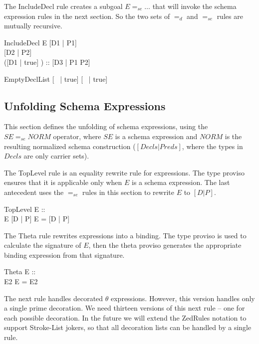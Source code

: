 \documentclass{entcs}
\newcommand{\sexprUnfoldsTo}{\mathrel{=_{se}}}
\newcommand{\declListUnfoldsTo}{\mathrel{=_d}}
\newcommand{\is}{\mathrel{is}}
\begin{document}
The IncludeDecl rule creates a subgoal $E \sexprUnfoldsTo \ldots$ that
will invoke the schema expression rules in the next section.  So the
two sets of $\declListUnfoldsTo$ and $\sexprUnfoldsTo$ rules are
mutually recursive.

\begin{zedrule}{IncludeDecl}
   E \sexprUnfoldsTo [D1 | P1] \\
   [D | true] \declListUnfoldsTo [D2 | P2] \\
   \proviso ([D1 | true] \land [D2 | true]) :: \power [D3 | true] 
\derives
   [E; D | true] \declListUnfoldsTo [D3 |  P1 \land P2]
\end{zedrule}

\begin{zedrule}{EmptyDeclList}
   [~ | true] \declListUnfoldsTo [~ | true]
\end{zedrule}


\subsection{Unfolding Schema Expressions}

This section defines the unfolding of schema expressions,
using the $SE \sexprUnfoldsTo NORM$ operator, where $SE$
is a schema expression and $NORM$ is the resulting normalized
schema construction ($[Decls|Preds]$, where the types in $Decls$
are only carrier sets).

The TopLevel rule is an equality rewrite rule for expressions.  The
type proviso ensures that it is applicable only when $E$ is a schema
expression.  The last antecedent uses the $\sexprUnfoldsTo$ rules in
this section to rewrite $E$ to $[D | P]$.

\begin{zedrule}{TopLevel}
  \proviso E :: \power [D2 | true] \\
  E  \sexprUnfoldsTo [D | P]
\derives
  E = [D | P]
\end{zedrule}

The Theta rule rewrites expressions into a binding.  The type
proviso is used to calculate the signature of $E$, then the theta
proviso generates the appropriate binding expression from that
signature.
\begin{zedrule}{Theta}
  \proviso E :: \power [D | true] \\
  \proviso \theta [D | true] \is E2
\derives
  \theta E = E2
\end{zedrule}


The next rule handles decorated $\theta$ expressions.  However, this
version handles only a single prime decoration.  We need thirteen
versions of this next rule -- one for 
each possible decoration.   In the future we will extend the ZedRules
notation to support Stroke-List jokers, so that all decoration lists can
be handled by a single rule.
\end{document}
